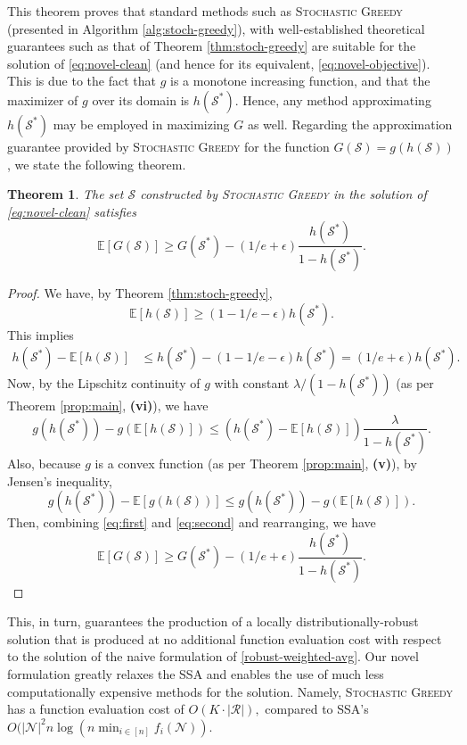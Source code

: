 \documentclass[letter,11pt]{article}
\newtheorem{theorem}{Theorem}[]
\DeclareMathOperator{\E}{\mathbb{E}}
\def\lp{\left(}
\def\rp{\right)}
\def\E{\mathbb{E}}
\def\sS{\mathcal{S}}
\def\sN{\mathcal{N}}
\begin{document}
This theorem proves that standard methods such as \textsc{Stochastic Greedy} (presented in Algorithm \ref{alg:stoch-greedy}), with well-established theoretical guarantees such as that of Theorem \ref{thm:stoch-greedy} are suitable for the solution of \eqref{eq:novel-clean} (and hence for its equivalent, \ref{eq:novel-objective}). This is due to the fact that $g$ is a monotone increasing function, and that the maximizer of $g$ over its domain is $h(\sS^\ast)$. Hence, any method approximating $h(\sS^\ast)$ may be employed in maximizing $G$ as well. Regarding the approximation guarantee provided by \textsc{Stochastic Greedy} for the function $G(\sS) = g(h(\sS))$, we state the following theorem.
\begin{theorem} The set $\sS$ constructed by
\textsc{Stochastic Greedy} in the solution of \eqref{eq:novel-clean} satisfies
\begin{equation}
\E [ G(\sS)] \geq G(\sS^\ast) - (1/e + \epsilon) \dfrac{h(\sS^\ast)}{1-h(\sS^\ast)}.
\end{equation}
\end{theorem}
\begin{proof}
We have, by Theorem \ref{thm:stoch-greedy},
\begin{equation}
\E[h(\sS)] \geq (1-1/e-\epsilon) h(\sS^\ast).
\end{equation}
This implies
\begin{equation}
\begin{split}
h(\sS^\ast) - \E[h(\sS)] &\leq h(\sS^\ast) - (1-1/e-\epsilon) h(\sS^\ast) = (1/e+\epsilon) h(\sS^\ast).
\end{split}
\end{equation}
Now, by the Lipschitz continuity of $g$ with constant $\lambda/(1-h(\sS^\ast))$ (as per Theorem \ref{prop:main}, \textbf{(vi)}), we have
\begin{equation}\label{eq:first}
g( h(\sS^\ast)) - g(\E[h(\sS)]) \leq ( h(\sS^\ast) - \E[h(\sS)]) \dfrac{\lambda}{1-h(\sS^\ast)}.
\end{equation}
Also, because $g$ is a convex function (as per Theorem \ref{prop:main}, \textbf{(v)}), by Jensen's inequality,
\begin{equation}\label{eq:second}
g\lp h(\sS^\ast)\rp - \E[g(h(\sS))] \leq g( h(\sS^\ast)) - g(\E[h(\sS)]).
\end{equation}
Then, combining \eqref{eq:first} and \eqref{eq:second} and rearranging, we have
\begin{equation}
\E [ G(\sS)] \geq G(\sS^\ast) - (1/e + \epsilon) \dfrac{h(\sS^\ast)}{1-h(\sS^\ast)}.
\end{equation}
\end{proof}
This, in turn, guarantees the production of a locally distributionally-robust solution that is produced at no additional function evaluation cost with respect to the solution of the naive formulation of \eqref{robust-weighted-avg}. Our novel formulation greatly relaxes the SSA and enables the use of much less computationally expensive methods for the solution. Namely, \textsc{Stochastic Greedy} has a function evaluation cost of $O(K\cdot\lvert \mathcal{R}\rvert),$ compared to SSA's $O(\lvert \sN\rvert^2 n \log(n \min_{i\in[n]} f_i (\sN)).$
\end{document}
